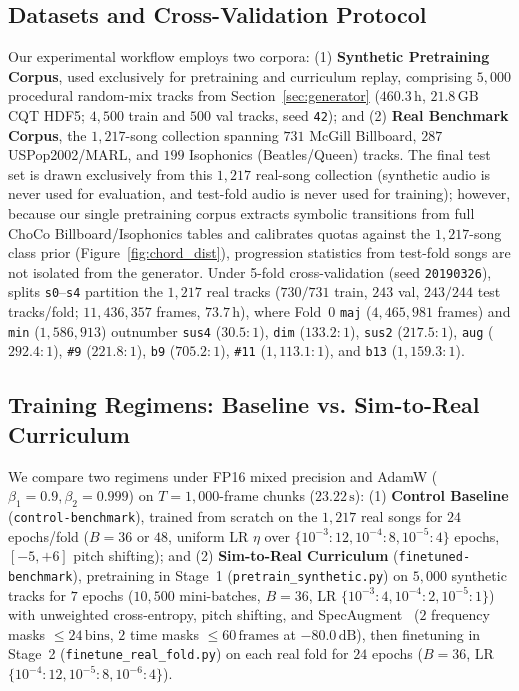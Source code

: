 \documentclass{article}
\begin{document}
\subsection{Datasets and Cross-Validation Protocol}\label{subsec:datasets_splits}

Our experimental workflow employs two corpora: (1) \textbf{Synthetic Pretraining Corpus}, used exclusively for pretraining and curriculum replay, comprising $5{,}000$ procedural random-mix tracks from Section~\ref{sec:generator} ($460.3\,\text{h}$, $21.8\,\text{GB}$ CQT HDF5; $4{,}500$ train and $500$ val tracks, seed \texttt{42}); and (2) \textbf{Real Benchmark Corpus}, the $1{,}217$-song collection spanning $731$ McGill Billboard, $287$ USPop2002/MARL, and $199$ Isophonics (Beatles/Queen) tracks. The final test set is drawn exclusively from this $1{,}217$ real-song collection (synthetic audio is never used for evaluation, and test-fold audio is never used for training); however, because our single pretraining corpus extracts symbolic transitions from full ChoCo Billboard/Isophonics tables and calibrates quotas against the $1{,}217$-song class prior (Figure~\ref{fig:chord_dist}), progression statistics from test-fold songs are not isolated from the generator. Under 5-fold cross-validation (seed \texttt{20190326}), splits \texttt{s0}--\texttt{s4} partition the $1{,}217$ real tracks ($730/731$ train, $243$ val, $243/244$ test tracks/fold; $11{,}436{,}357$ frames, $73.7\,\text{h}$), where Fold~0 {\small\texttt{maj}} ($4{,}465{,}981$ frames) and {\small\texttt{min}} ($1{,}586{,}913$) outnumber {\small\texttt{sus4}} ($30.5\!:\!1$), {\small\texttt{dim}} ($133.2\!:\!1$), {\small\texttt{sus2}} ($217.5\!:\!1$), {\small\texttt{aug}} ($292.4\!:\!1$), {\small\texttt{\#9}} ($221.8\!:\!1$), {\small\texttt{b9}} ($705.2\!:\!1$), {\small\texttt{\#11}} ($1{,}113.1\!:\!1$), and {\small\texttt{b13}} ($1{,}159.3\!:\!1$).

\subsection{Training Regimens: Baseline vs. Sim-to-Real Curriculum}\label{subsec:training_regimens}

We compare two regimens under FP16 mixed precision and AdamW ($\beta_1=0.9, \beta_2=0.999$) on $T = 1{,}000$-frame chunks ($23.22\,\text{s}$): (1) \textbf{Control Baseline} ({\small\texttt{control-\allowbreak benchmark}}), trained from scratch on the $1{,}217$ real songs for $24$ epochs/fold ($B=36$ or $48$, uniform LR $\eta$ over $\{10^{-3}\!:\!12, 10^{-4}\!:\!8, 10^{-5}\!:\!4\}$ epochs, $[-5, +6]$ pitch shifting); and (2) \textbf{Sim-to-Real Curriculum} ({\small\texttt{finetuned-\allowbreak benchmark}}), pretraining in Stage~1 ({\small\texttt{pretrain\_synthetic.py}}) on $5{,}000$ synthetic tracks for $7$ epochs ($10{,}500$ mini-batches, $B=36$, LR $\{10^{-3}\!:\!4, 10^{-4}\!:\!2, 10^{-5}\!:\!1\}$) with unweighted cross-entropy, pitch shifting, and SpecAugment~\cite{park2019specaugment} ($2$ frequency masks $\le 24\,\text{bins}$, $2$ time masks $\le 60\,\text{frames}$ at $-80.0\,\text{dB}$), then finetuning in Stage~2 ({\small\texttt{finetune\_real\_fold.py}}) on each real fold for $24$ epochs ($B=36$, LR $\{10^{-4}\!:\!12, 10^{-5}\!:\!8, 10^{-6}\!:\!4\}$).
\end{document}
